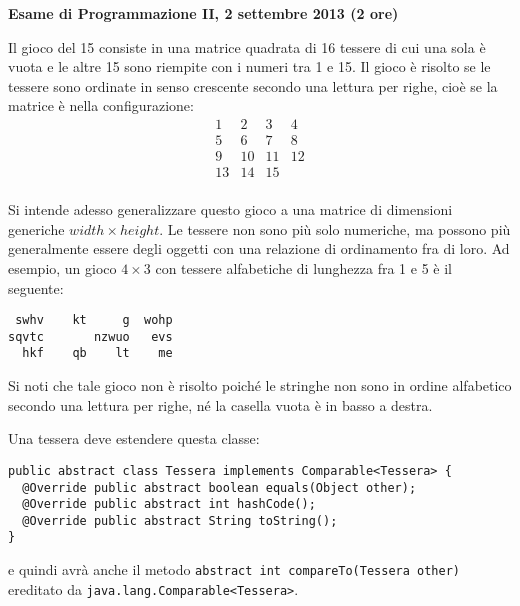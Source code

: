 \documentclass{article}[10pt]
\begin{document}
\begin{center} {\bf Esame di Programmazione II, 2 settembre 2013 (2 ore)}\end{center}

Il gioco del 15 consiste in una matrice quadrata di 16 tessere di cui una sola \`e
vuota e le altre 15 sono riempite con i numeri tra 1 e 15. Il gioco \`e risolto se
le tessere sono ordinate in senso crescente secondo una lettura per righe,
cio\`e se la matrice \`e nella configurazione:
%
\[\begin{array}{cccc}
 1 & 2 & 3 & 4\\
 5 & 6 & 7 & 8\\
 9 & 10 & 11 & 12\\
 13 & 14 & 15 & \\
\end{array}\]

Si intende adesso generalizzare questo gioco a una matrice di dimensioni generiche
$\mathit{width}\times\mathit{height}$. Le tessere non sono
pi\`u solo numeriche, ma possono pi\`u generalmente essere degli oggetti
con una relazione di ordinamento fra di loro. Ad esempio, un gioco
$4\times 3$ con tessere alfabetiche di lunghezza fra 1 e 5 \`e il seguente:
%
{\small
\begin{verbatim}
 swhv    kt     g  wohp 
sqvtc       nzwuo   evs 
  hkf    qb    lt    me 
\end{verbatim}
}

\noindent
Si noti che tale gioco non \`e risolto poich\'e le stringhe non sono in ordine
alfabetico secondo una lettura per righe, n\'e la casella vuota \`e in basso a destra.

Una tessera deve estendere questa classe:
{\small
\begin{verbatim}
public abstract class Tessera implements Comparable<Tessera> {
  @Override public abstract boolean equals(Object other);
  @Override public abstract int hashCode();
  @Override public abstract String toString();
}
\end{verbatim}
}

\noindent
e quindi avr\`a anche il metodo \texttt{abstract int compareTo(Tessera other)} ereditato
da \texttt{java.lang.Comparable<Tessera>}.
\end{document}
